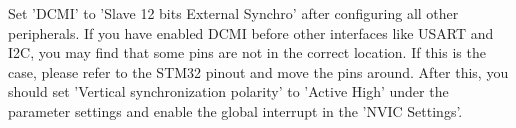 Set 'DCMI' to 'Slave 12 bits External Synchro' after configuring all other peripherals. If you have enabled DCMI before other interfaces like USART and I2C, you may find that some pins are not in the correct location.
If this is the case, please refer to the STM32 pinout and move the pins around.
After this, you should set 'Vertical synchronization polarity' to 'Active High' under the parameter settings and enable the global interrupt in the 'NVIC Settings'.